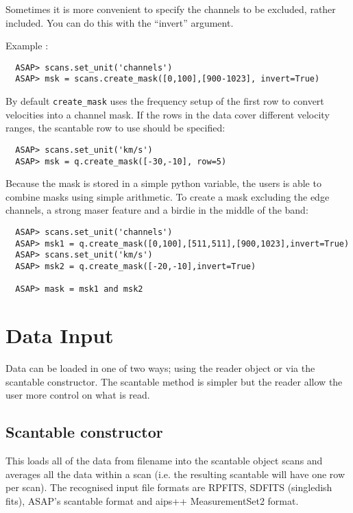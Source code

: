 \documentclass[11pt]{article}
\newcommand{\cmd}[1]{{\tt #1}}
\begin{document}
Sometimes it is more convenient to specify the channels to be
excluded, rather included.  You can do this with the ``invert''
argument.

Example :
\begin{verbatim}
  ASAP> scans.set_unit('channels')
  ASAP> msk = scans.create_mask([0,100],[900-1023], invert=True)   
\end{verbatim}

By default \cmd{create\_mask} uses the frequency setup of the first row
to convert velocities into a channel mask. If the rows in the data
cover different velocity ranges, the scantable row to use should be
specified:

\begin{verbatim}
  ASAP> scans.set_unit('km/s')
  ASAP> msk = q.create_mask([-30,-10], row=5)
\end{verbatim}

Because the mask is stored in a simple python variable, the users is
able to combine masks using simple arithmetic. To create a mask
excluding the edge channels, a strong maser feature and a birdie in
the middle of the band:

\begin{verbatim}
  ASAP> scans.set_unit('channels')
  ASAP> msk1 = q.create_mask([0,100],[511,511],[900,1023],invert=True)
  ASAP> scans.set_unit('km/s')
  ASAP> msk2 = q.create_mask([-20,-10],invert=True)

  ASAP> mask = msk1 and msk2
\end{verbatim}


\section{Data Input}

Data can be loaded in one of two ways; using the reader object or via
the scantable constructor. The scantable method is simpler but the
reader allow the user more control on what is read.

\subsection{Scantable constructor}

This loads all of the data from filename into the scantable object scans
and averages all the data within a scan (i.e.  the resulting scantable
will have one row per scan).  The recognised input file formats are
RPFITS, SDFITS (singledish fits), ASAP's scantable format and aips++
MeasurementSet2 format. 
\end{document}
